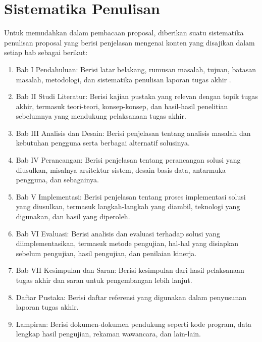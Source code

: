 \section{Sistematika Penulisan}
Untuk memudahkan dalam pembacaan proposal, diberikan suatu sistematika penulisan proposal yang berisi penjelasan mengenai konten yang disajikan dalam setiap bab sebagai berikut:
\begin{enumerate}
\item	Bab I Pendahuluan: Berisi latar belakang, rumusan masalah, tujuan, batasan masalah, metodologi, dan sistematika penulisan laporan tugas akhir       .
\item	Bab II Studi Literatur: Berisi kajian pustaka yang relevan dengan topik tugas akhir, termasuk teori-teori, konsep-konsep, dan hasil-hasil penelitian sebelumnya yang                mendukung pelaksanaan tugas akhir.
\item	Bab III Analisis dan Desain: Berisi penjelasan tentang analisis masalah dan kebutuhan pengguna serta berbagai alternatif solusinya.
\item   Bab IV Perancangan: Berisi penjelasan tentang perancangan solusi yang diusulkan, misalnya arsitektur sistem, desain basis data, antarmuka pengguna, dan sebagainya.
\item	Bab V Implementasi: Berisi penjelasan tentang proses implementasi solusi yang diusulkan, termasuk langkah-langkah yang diambil, teknologi yang digunakan, dan hasil yang diperoleh.
\item	Bab VI Evaluasi: Berisi analisis dan evaluasi terhadap solusi yang diimplementasikan, termasuk metode pengujian, hal-hal yang disiapkan sebelum pengujian, hasil pengujian, dan penilaian kinerja.                  
\item   Bab VII Kesimpulan dan Saran: Berisi kesimpulan dari hasil pelaksanaan tugas akhir dan saran untuk pengembangan lebih lanjut.
\item   Daftar Pustaka: Berisi daftar referensi yang digunakan dalam penyusunan laporan tugas akhir.
\item   Lampiran: Berisi dokumen-dokumen pendukung seperti kode program, data lengkap hasil pengujian, rekaman wawancara, dan lain-lain. 
\end{enumerate}